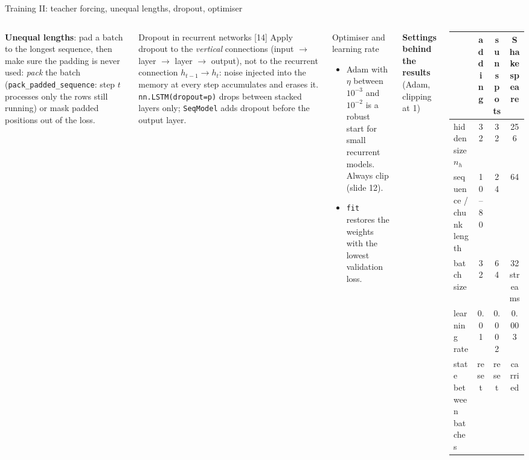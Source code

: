 \documentclass[aspectratio=169,10pt]{beamer}
\renewcommand{\cite}[1]{{\scriptsize\color{cTok}[#1]}}
\newcommand{\key}[1]{\textbf{\color{cAtt}#1}}
\begin{document}
\begin{frame}{Training II: teacher forcing, unequal lengths, dropout, optimiser}
\begin{columns}[T,onlytextwidth]
\raggedright\footnotesize
\key{Unequal lengths}: pad a batch to the longest sequence, then make sure the padding is never
used: \emph{pack} the batch (\texttt{pack\_padded\_sequence}: step $t$ processes only the rows still
running) or mask padded positions out of the loss.
\small
\begin{block}{Dropout in recurrent networks \cite{14}}
\footnotesize
Apply dropout to the \emph{vertical} connections (input $\to$ layer $\to$ layer $\to$ output), not
to the recurrent connection $h_{t-1}\to h_t$: noise injected into the memory at every step
accumulates and erases it. \texttt{nn.LSTM(dropout=p)} drops between stacked layers only;
\texttt{SeqModel} adds dropout before the output layer.
\end{block}
\begin{block}{Optimiser and learning rate}
\footnotesize
\begin{itemize}
  \item Adam with $\eta$ between $10^{-3}$ and $10^{-2}$ is a robust start for small recurrent
        models. Always clip (slide 12).
  \item \texttt{fit} restores the weights with the lowest validation loss.
\end{itemize}
\end{block}
{\footnotesize
\renewcommand{\arraystretch}{1.15}
\textbf{Settings behind the results} (Adam, clipping at 1)

\vspace{0.5mm}
\begin{tabular}{@{}lccc@{}}
\toprule
 & adding & sunspots & Shakespeare\\
\midrule
hidden size $n_h$ & 32 & 32 & 256\\
sequence / chunk length & 10--80 & 24 & 64\\
batch size & 32 & 64 & 32 streams\\
learning rate & 0.01 & 0.002 & 0.003\\
state between batches & reset & reset & carried\\
\bottomrule
\end{tabular}}
\end{columns}
\end{frame}
\end{document}
